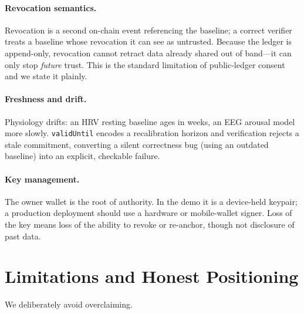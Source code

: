 \documentclass[10pt,twocolumn]{article}
\newcommand{\code}[1]{\texttt{\small #1}}
\begin{document}
\paragraph{Revocation semantics.} Revocation is a second on-chain event
referencing the baseline; a correct verifier treats a baseline whose revocation
it can see as untrusted. Because the ledger is append-only, revocation cannot
retract data already shared out of band---it can only stop \emph{future} trust.
This is the standard limitation of public-ledger consent and we state it plainly.

\paragraph{Freshness and drift.} Physiology drifts: an HRV resting baseline ages
in weeks, an EEG arousal model more slowly. \code{validUntil} encodes a
recalibration horizon and verification rejects a stale commitment, converting a
silent correctness bug (using an outdated baseline) into an explicit, checkable
failure.

\paragraph{Key management.} The owner wallet is the root of authority. In the
demo it is a device-held keypair; a production deployment should use a hardware
or mobile-wallet signer. Loss of the key means loss of the ability to revoke or
re-anchor, though not disclosure of past data.

\section{Limitations and Honest Positioning}

We deliberately avoid overclaiming.
\end{document}
